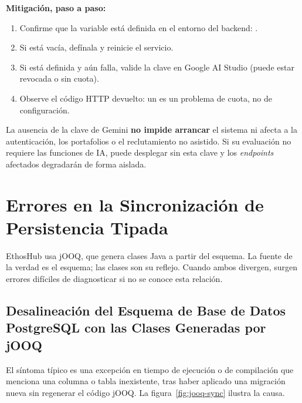 \par\vspace{0.2cm}
\textbf{Mitigación, paso a paso:}\par
\begin{enumerate}[noitemsep]
    \item Confirme que la variable está definida en el entorno del backend: .
    \item Si está vacía, defínala y reinicie el servicio.
    \item Si está definida y aún falla, valide la clave en Google AI Studio (puede estar revocada o sin cuota).
    \item Observe el código HTTP devuelto: un  es un problema de cuota, no de configuración.
\end{enumerate}

\begin{NotaConfiguracion}
La ausencia de la clave de Gemini \textbf{no impide arrancar} el sistema ni afecta a la
autenticación, los portafolios o el reclutamiento no asistido. Si su evaluación no requiere
las funciones de IA, puede desplegar sin esta clave y los \textit{endpoints} afectados
degradarán de forma aislada.
\end{NotaConfiguracion}

\section{Errores en la Sincronización de Persistencia Tipada}%
\label{sec:persistencia}

EthosHub usa jOOQ, que genera clases Java a partir del esquema. La fuente de la verdad es
el esquema; las clases son su reflejo. Cuando ambos divergen, surgen errores difíciles de
diagnosticar si no se conoce esta relación.\par

\subsection[Desalineación de Esquema y Clases jOOQ]{Desalineación del Esquema de Base de Datos PostgreSQL con las Clases Generadas por jOOQ}%
\label{sec:error-jooq}

El síntoma típico es una excepción en tiempo de ejecución o de compilación que menciona una
columna o tabla inexistente, tras haber aplicado una migración nueva sin regenerar el
código jOOQ. La figura~\ref{fig:jooq-sync} ilustra la causa.\par


